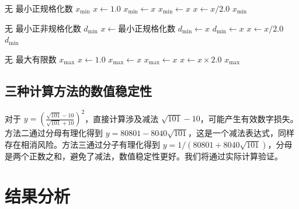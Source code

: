 \documentclass{article}
\begin{document}
\begin{algorithm}[H]
\caption{计算最小正规格化数}
\begin{algorithmic}[1]
\REQUIRE 无
\ENSURE 最小正规格化数 $x_{\min}$
\STATE $x \gets 1.0$
\STATE $x_{\min} \gets x$
    \STATE $x_{\min} \gets x$
    \STATE $x \gets x / 2.0$
\ENDWHILE
\RETURN $x_{\min}$
\end{algorithmic}
\end{algorithm}

\begin{algorithm}[H]
\caption{计算最小正非规格化数}
\begin{algorithmic}[1]
\REQUIRE 无
\ENSURE 最小正非规格化数 $d_{\min}$
\STATE $x \gets \text{最小正规格化数}$
\STATE $d_{\min} \gets x$
    \STATE $d_{\min} \gets x$
    \STATE $x \gets x / 2.0$
\ENDWHILE
\RETURN $d_{\min}$
\end{algorithmic}
\end{algorithm}

\begin{algorithm}[H]
\caption{计算最大有限数}
\begin{algorithmic}[1]
\REQUIRE 无
\ENSURE 最大有限数 $x_{\max}$
\STATE $x \gets 1.0$
\STATE $x_{\max} \gets x$
    \STATE $x_{\max} \gets x$
    \STATE $x \gets x \times 2.0$
\ENDWHILE
\RETURN $x_{\max}$
\end{algorithmic}
\end{algorithm}

\subsection{三种计算方法的数值稳定性}
对于 \(y = \left(\frac{\sqrt{101}-10}{\sqrt{101}+10}\right)^2\)，直接计算涉及减法 \(\sqrt{101}-10\)，可能产生有效数字损失。方法二通过分母有理化得到 \(y = 80801 - 8040\sqrt{101}\)，这是一个减法表达式，同样存在相消风险。方法三通过分子有理化得到 \(y = 1/(80801+8040\sqrt{101})\)，分母是两个正数之和，避免了减法，数值稳定性更好。我们将通过实际计算验证。

\section{结果分析}
\end{document}

